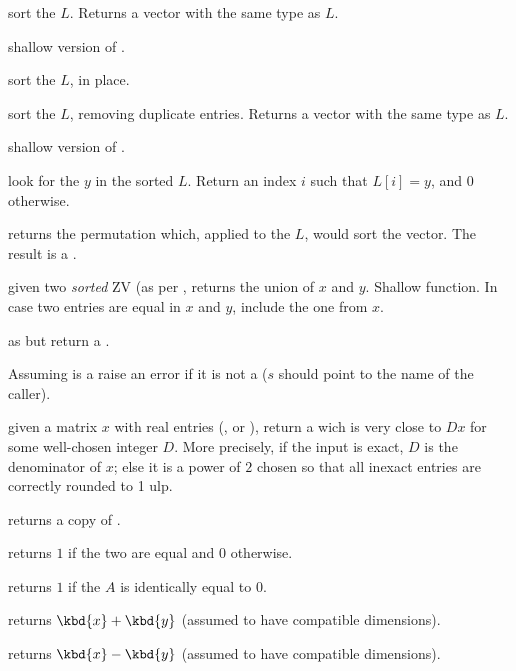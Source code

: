  sort the  $L$.
Returns a vector with the same type as $L$.

 shallow version of .

 sort the  $L$, in place.

 sort the  $L$, removing duplicate
entries. Returns a vector with the same type as $L$.

 shallow version of .

 look for the  $y$ in the sorted
 $L$. Return an index $i$ such that $L[i] = y$, and  $0$ otherwise.

 returns the permutation which, applied to the
 $L$, would sort the vector. The result is a .

 given two \emph{sorted} ZV (as per
, returns the union of $x$ and $y$. Shallow function. In case two
entries are equal in $x$ and $y$,  include the one from $x$.

 as  but return
a .


 Assuming  is a 
raise an error if it is not a  ($s$ should point to the name of the
caller).

 given a matrix $x$ with real entries
(,  or ), return a  wich is very close
to $D x$ for some well-chosen integer $D$. More precisely, if the input is
exact, $D$ is the denominator of $x$; else it is a power of $2$ chosen
so that all inexact entries are correctly rounded to 1 ulp.

 returns a copy of .

 returns $1$ if the two  are equal
and $0$ otherwise.

 returns $1$ if the  $A$ is identically
equal to $0$.

 returns $\kbd{x} + \kbd{y}$ (assumed to have
compatible dimensions).

 returns $\kbd{x} - \kbd{y}$ (assumed to have
compatible dimensions).


